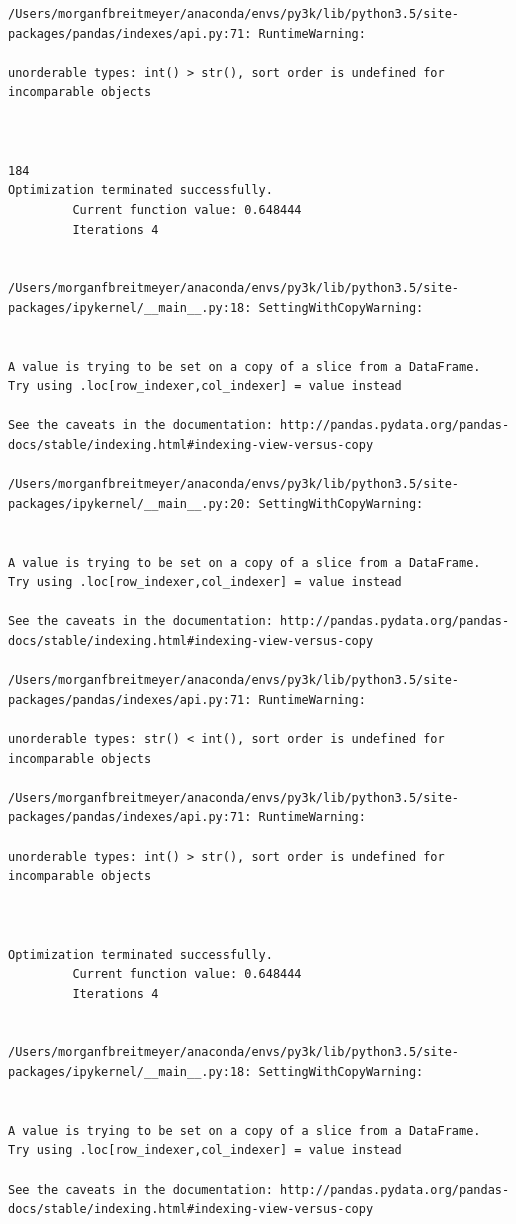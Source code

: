 \begin{lstlisting}
/Users/morganfbreitmeyer/anaconda/envs/py3k/lib/python3.5/site-packages/pandas/indexes/api.py:71: RuntimeWarning:

unorderable types: int() > str(), sort order is undefined for incomparable objects



184
Optimization terminated successfully.
         Current function value: 0.648444
         Iterations 4


/Users/morganfbreitmeyer/anaconda/envs/py3k/lib/python3.5/site-packages/ipykernel/__main__.py:18: SettingWithCopyWarning:


A value is trying to be set on a copy of a slice from a DataFrame.
Try using .loc[row_indexer,col_indexer] = value instead

See the caveats in the documentation: http://pandas.pydata.org/pandas-docs/stable/indexing.html#indexing-view-versus-copy

/Users/morganfbreitmeyer/anaconda/envs/py3k/lib/python3.5/site-packages/ipykernel/__main__.py:20: SettingWithCopyWarning:


A value is trying to be set on a copy of a slice from a DataFrame.
Try using .loc[row_indexer,col_indexer] = value instead

See the caveats in the documentation: http://pandas.pydata.org/pandas-docs/stable/indexing.html#indexing-view-versus-copy

/Users/morganfbreitmeyer/anaconda/envs/py3k/lib/python3.5/site-packages/pandas/indexes/api.py:71: RuntimeWarning:

unorderable types: str() < int(), sort order is undefined for incomparable objects

/Users/morganfbreitmeyer/anaconda/envs/py3k/lib/python3.5/site-packages/pandas/indexes/api.py:71: RuntimeWarning:

unorderable types: int() > str(), sort order is undefined for incomparable objects



Optimization terminated successfully.
         Current function value: 0.648444
         Iterations 4


/Users/morganfbreitmeyer/anaconda/envs/py3k/lib/python3.5/site-packages/ipykernel/__main__.py:18: SettingWithCopyWarning:


A value is trying to be set on a copy of a slice from a DataFrame.
Try using .loc[row_indexer,col_indexer] = value instead

See the caveats in the documentation: http://pandas.pydata.org/pandas-docs/stable/indexing.html#indexing-view-versus-copy


\end{lstlisting}
